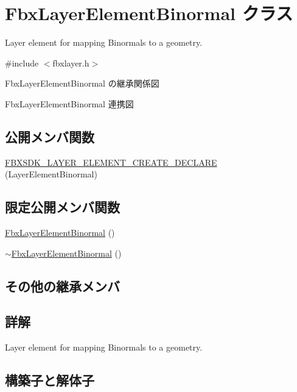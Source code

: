 \hypertarget{class_fbx_layer_element_binormal}{}\section{Fbx\+Layer\+Element\+Binormal クラス}
\label{class_fbx_layer_element_binormal}


Layer element for mapping Binormals to a geometry.  




{\ttfamily \#include $<$fbxlayer.\+h$>$}



Fbx\+Layer\+Element\+Binormal の継承関係図


Fbx\+Layer\+Element\+Binormal 連携図
\subsection*{公開メンバ関数}
\begin{DoxyCompactItemize}
\item 
\hyperlink{class_fbx_layer_element_binormal_abe45283c25e5d9f9d079886a7a1a3767}{F\+B\+X\+S\+D\+K\+\_\+\+L\+A\+Y\+E\+R\+\_\+\+E\+L\+E\+M\+E\+N\+T\+\_\+\+C\+R\+E\+A\+T\+E\+\_\+\+D\+E\+C\+L\+A\+RE} (Layer\+Element\+Binormal)
\end{DoxyCompactItemize}
\subsection*{限定公開メンバ関数}
\begin{DoxyCompactItemize}
\item 
\hyperlink{class_fbx_layer_element_binormal_a6071e29087d2027cb6e2c66dfcb07506}{Fbx\+Layer\+Element\+Binormal} ()
\item 
\hyperlink{class_fbx_layer_element_binormal_af7376b512370ceb1a53a22325d6c12a7}{$\sim$\+Fbx\+Layer\+Element\+Binormal} ()
\end{DoxyCompactItemize}
\subsection*{その他の継承メンバ}


\subsection{詳解}
Layer element for mapping Binormals to a geometry. 

\subsection{構築子と解体子}
\mbox{\label{class_fbx_layer_element_binormal_a6071e29087d2027cb6e2c66dfcb07506}} 
